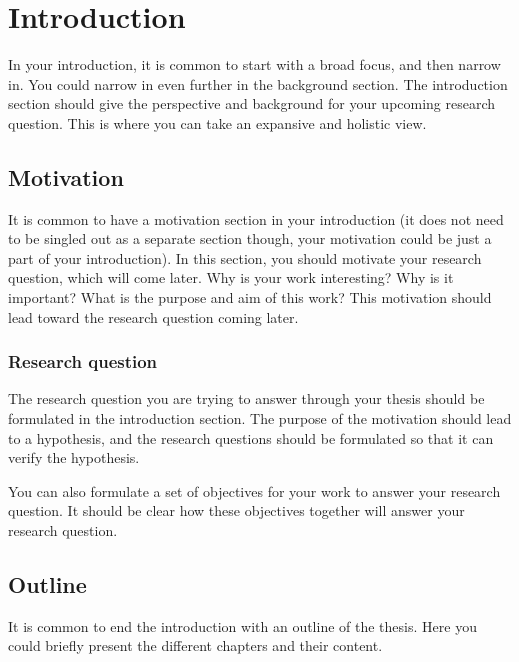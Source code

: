 \chapter{Introduction}
\label{chap:Introduction}

In your introduction, it is common to start with a broad focus, and then narrow in. You could narrow in even further in the background section. The introduction section should give the perspective and background for your upcoming research question. This is where you can take an expansive and holistic view.

\section{Motivation}

It is common to have a motivation section in your introduction (it does not need to be singled out as a separate section though, your motivation could be just a part of your introduction). In this section, you should motivate your research question, which will come later. Why is your work interesting? Why is it important? What is the purpose and aim of this work? This motivation should lead toward the research question coming later.


\subsection{Research question}

The research question you are trying to answer through your thesis should be formulated in the introduction section. The purpose of the motivation should lead to a hypothesis, and the research questions should be formulated so that it can verify the hypothesis.

You can also formulate a set of objectives for your work to answer your research question.  It should be clear how these objectives together will answer your research question.

\section{Outline}

It is common to end the introduction with an outline of the thesis. Here you could briefly present the different chapters and their content.